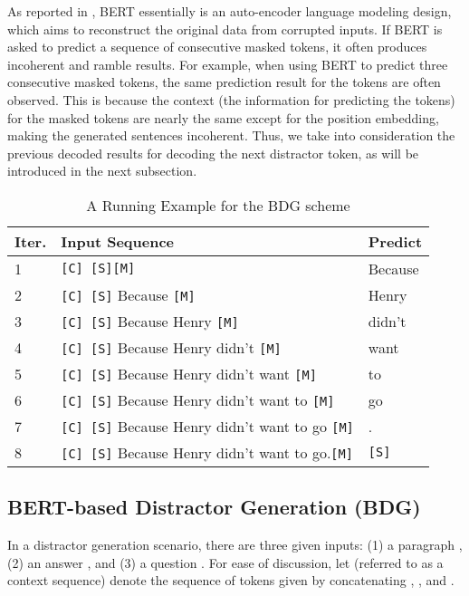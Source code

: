 \documentclass[11pt,a4paper]{article}
\begin{document}
As reported in \cite{chan2019recurrent, dong2019unified}, BERT essentially is an auto-encoder language modeling design, which aims to reconstruct the original data from corrupted inputs. If BERT is asked to predict a sequence of consecutive masked tokens, it often produces incoherent and ramble results. For example, when using BERT to predict three consecutive  masked tokens, the same prediction result for the tokens are often observed. This is because the context (the information for predicting the tokens) for the masked tokens are nearly the same except for the position embedding, making the generated sentences incoherent. Thus, we take into consideration the previous decoded results for decoding the next distractor token, as will be introduced in the next subsection.


\begin{table*}
\centering
\begin{tabular}{|l|l|l|}
\hline
Iter. & Input Sequence & Predict \\ \hline
1 & \texttt{[C]  [S][M]} & Because  \\ \hline
2 & \texttt{[C]  [S]} Because  \texttt{[M]} & Henry \\ \hline
3 & \texttt{[C]  [S]} Because Henry \texttt{[M]} & didn't \\ \hline
4 & \texttt{[C]  [S]} Because Henry didn't \texttt{[M]} & want \\ \hline
5 & \texttt{[C]  [S]} Because Henry didn't want \texttt{[M]} & to \\ \hline
6 & \texttt{[C]  [S]} Because Henry didn't want to  \texttt{[M]} & go \\ \hline
7 & \texttt{[C]  [S]} Because Henry didn't want to go  \texttt{[M]} & . \\ \hline
8 & \texttt{[C]  [S]} Because Henry didn't want to go.\texttt{[M]} & \texttt{{[}S{]}} \\ \hline
\end{tabular}
\caption{A Running Example for the BDG scheme}
\label{tab:dg}
\end{table*}



\subsection{BERT-based Distractor Generation (BDG)}\label{sec:BDG_architecture}


In a distractor generation scenario, there are three given inputs: (1) a paragraph , (2) an answer , and (3) a question . For ease of discussion, let  (referred to as a context sequence) denote the sequence of tokens given by concatenating , , and . 
\end{document}
